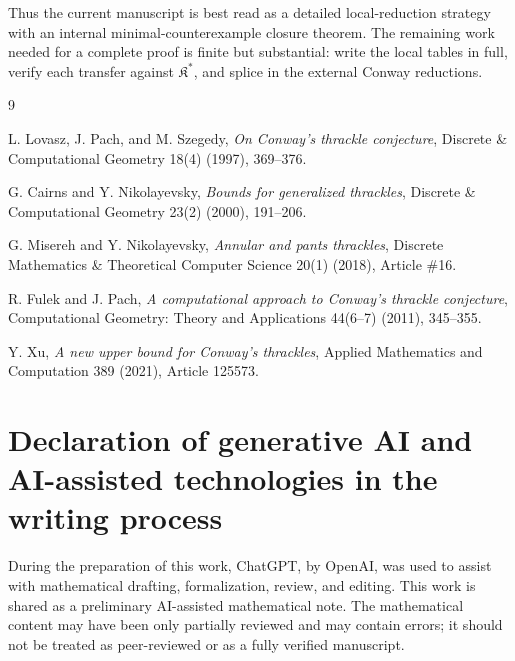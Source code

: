 \documentclass[11pt]{amsart}
\theoremstyle{definition}
\begin{document}
Thus the current manuscript is best read as a detailed local-reduction strategy
with an internal minimal-counterexample closure theorem. The remaining work
needed for a complete proof is finite but substantial: write the local tables in
full, verify each transfer against \(\mathfrak K^\ast\), and splice in the
external Conway reductions.

\begin{thebibliography}{9}

L. Lovasz, J. Pach, and M. Szegedy, \emph{On Conway's thrackle conjecture}, Discrete \& Computational Geometry 18(4) (1997), 369--376.


G. Cairns and Y. Nikolayevsky, \emph{Bounds for generalized thrackles}, Discrete \& Computational Geometry 23(2) (2000), 191--206.


G. Misereh and Y. Nikolayevsky, \emph{Annular and pants thrackles}, Discrete Mathematics \& Theoretical Computer Science 20(1) (2018), Article \#16.


R. Fulek and J. Pach, \emph{A computational approach to Conway's thrackle conjecture}, Computational Geometry: Theory and Applications 44(6--7) (2011), 345--355.


Y. Xu, \emph{A new upper bound for Conway's thrackles}, Applied Mathematics and Computation 389 (2021), Article 125573.


\end{thebibliography}
\section*{Declaration of generative AI and AI-assisted technologies in the writing process}

During the preparation of this work, ChatGPT, by OpenAI, was used to assist with mathematical drafting, formalization, review, and editing. This work is shared as a preliminary AI-assisted mathematical note. The mathematical content may have been only partially reviewed and may contain errors; it should not be treated as peer-reviewed or as a fully verified manuscript.
\end{document}
